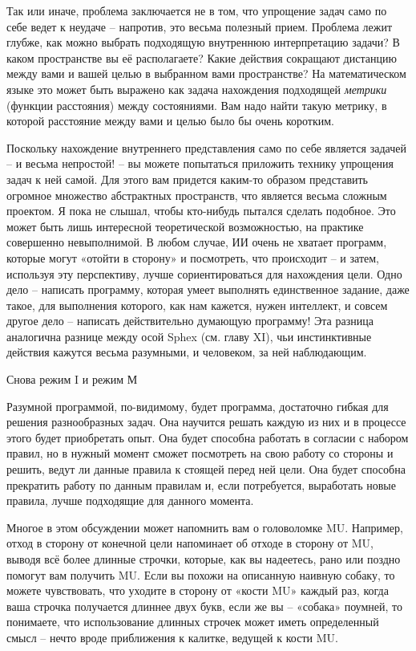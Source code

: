 \documentclass[../main.tex]{subfiles}
\begin{document}
Так или иначе, проблема заключается не в том, что упрощение задач само по себе ведет к неудаче \--- напротив, это весьма полезный прием. Проблема лежит глубже, как можно выбрать подходящую внутреннюю интерпретацию задачи? В каком пространстве вы её располагаете? Какие действия сокращают дистанцию между вами и вашей целью в выбранном вами пространстве? На математическом языке это может быть выражено как задача нахождения подходящей \emph{метрики} (функции расстояния) между состояниями. Вам надо найти такую метрику, в которой расстояние между вами и целью было бы очень коротким.

Поскольку нахождение внутреннего представления само по себе является задачей \--- и весьма непростой! \--- вы можете попытаться приложить технику упрощения задач к ней самой. Для этого вам придется каким-то образом представить огромное множество абстрактных пространств, что является весьма сложным проектом. Я пока не слышал, чтобы кто-нибудь пытался сделать подобное. Это может быть лишь интересной теоретической возможностью, на практике совершенно невыполнимой. В любом случае, ИИ очень не хватает программ, которые могут «отойти в сторону» и посмотреть, что происходит \--- и затем, используя эту перспективу, лучше сориентироваться для нахождения цели. Одно дело \--- написать программу, которая умеет выполнять единственное задание, даже такое, для выполнения которого, как нам кажется, нужен интеллект, и совсем другое дело \--- написать действительно думающую программу! Эта разница аналогична разнице между осой Sphex (см. главу XI), чьи инстинктивные действия кажутся весьма разумными, и человеком, за ней наблюдающим.

Снова режим I и режим М

Разумной программой, по-видимому, будет программа, достаточно гибкая для решения разнообразных задач. Она научится решать каждую из них и в процессе этого будет приобретать опыт. Она будет способна работать в согласии с набором правил, но в нужный момент сможет посмотреть на свою работу со стороны и решить, ведут ли данные правила к стоящей перед ней цели. Она будет способна прекратить работу по данным правилам и, если потребуется, выработать новые правила, лучше подходящие для данного момента.

Многое в этом обсуждении может напомнить вам о головоломке MU\@. Например, отход в сторону от конечной цели напоминает об отходе в сторону от MU, выводя всё более длинные строчки, которые, как вы надеетесь, рано или поздно помогут вам получить MU\@. Если вы похожи на описанную наивную собаку, то можете чувствовать, что уходите в сторону от «кости MU» каждый раз, когда ваша строчка получается длиннее двух букв, если же вы \--- «собака» поумней, то понимаете, что использование длинных строчек может иметь определенный смысл \--- нечто вроде приближения к калитке, ведущей к кости MU.
\end{document}
